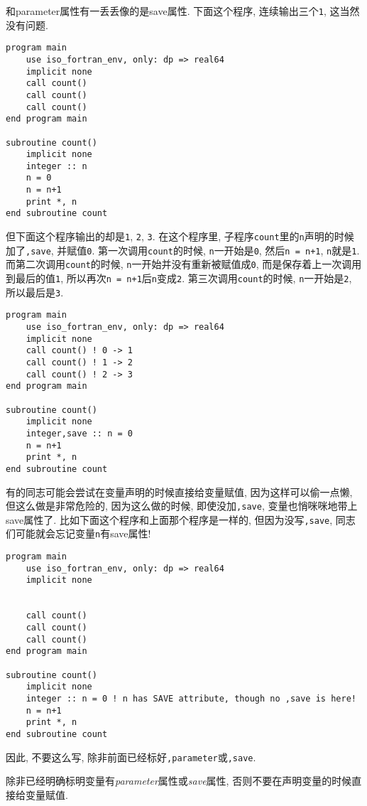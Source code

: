 和parameter属性有一丢丢像的是save属性. 下面这个程序, 连续输出三个\texttt{1}, 这当然没有问题.
\begin{lstlisting}
program main
    use iso_fortran_env, only: dp => real64
    implicit none
    call count()
    call count()
    call count()
end program main

subroutine count()
    implicit none
    integer :: n
    n = 0
    n = n+1
    print *, n
end subroutine count
\end{lstlisting}
但下面这个程序输出的却是\texttt{1}, \texttt{2}, \texttt{3}. 在这个程序里, 子程序\texttt{count}里的\texttt{n}声明的时候加了\texttt{,save}, 并赋值\texttt{0}. 第一次调用\texttt{count}的时候, \texttt{n}一开始是\texttt{0}, 然后\texttt{n = n+1}, \texttt{n}就是\texttt{1}. 而第二次调用\texttt{count}的时候, \texttt{n}一开始并没有重新被赋值成\texttt{0}, 而是保存着上一次调用到最后的值\texttt{1}, 所以再次\texttt{n = n+1}后\texttt{n}变成\texttt{2}. 第三次调用\texttt{count}的时候, \texttt{n}一开始是\texttt{2}, 所以最后是\texttt{3}.
\begin{lstlisting}
program main
    use iso_fortran_env, only: dp => real64
    implicit none
    call count() ! 0 -> 1
    call count() ! 1 -> 2
    call count() ! 2 -> 3
end program main

subroutine count()
    implicit none
    integer,save :: n = 0
    n = n+1
    print *, n
end subroutine count
\end{lstlisting}
有的同志可能会尝试在变量声明的时候直接给变量赋值, 因为这样可以偷一点懒, 但这么做是非常危险的, 因为这么做的时候, 即使没加\texttt{,save}, 变量也悄咪咪地带上save属性了. 比如下面这个程序和上面那个程序是一样的, 但因为没写\texttt{,save}, 同志们可能就会忘记变量\texttt{n}有save属性!
\begin{lstlisting}
program main
    use iso_fortran_env, only: dp => real64
    implicit none


    call count()
    call count()
    call count()
end program main

subroutine count()
    implicit none
    integer :: n = 0 ! n has SAVE attribute, though no ,save is here!
    n = n+1
    print *, n
end subroutine count
\end{lstlisting}
因此, 不要这么写, 除非前面已经标好\texttt{,parameter}或\texttt{,save}.

\begin{convention}
    除非已经明确标明变量有\emph{parameter}属性或\emph{save}属性, 否则不要在声明变量的时候直接给变量赋值.
\end{convention}


